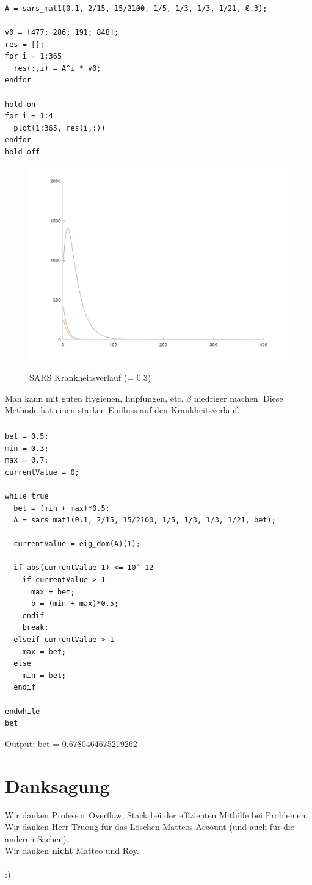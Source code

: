 \documentclass{article}
\begin{document}
\subsubsection{}
\begin{lstlisting}
A = sars_mat1(0.1, 2/15, 15/2100, 1/5, 1/3, 1/3, 1/21, 0.3);

v0 = [477; 286; 191; 848];
res = [];
for i = 1:365
  res(:,i) = A^i * v0;
endfor

hold on
for i = 1:4
  plot(1:365, res(i,:))
endfor
hold off
\end{lstlisting}

\begin{figure}[H]
\centering
\includegraphics[scale=0.3]{SARS1h.png}
\label{fig:universe}
\caption{SARS Krankheitsverlauf (\beta = 0.3)}
\end{figure}

Man kann mit guten Hygienen, Impfungen, etc. $\beta$ niedriger machen.
Diese Methode hat einen starken Einfluss auf den Krankheitsverlauf.

\subsubsection{}
\begin{lstlisting}
bet = 0.5;
min = 0.3;
max = 0.7;
currentValue = 0;

while true
  bet = (min + max)*0.5;
  A = sars_mat1(0.1, 2/15, 15/2100, 1/5, 1/3, 1/3, 1/21, bet);
  
  currentValue = eig_dom(A)(1);
  
  if abs(currentValue-1) <= 10^-12
    if currentValue > 1
      max = bet;
      b = (min + max)*0.5;
    endif
    break;
  elseif currentValue > 1
    max = bet;
  else
    min = bet;
  endif
  
endwhile
bet
\end{lstlisting}
Output: bet = 0.6780464675219262

\vspace{5mm}

\section{Danksagung}
Wir danken Professor Overflow, Stack bei der effizienten Mithilfe bei Problemen. \\
Wir danken Herr Truong für das Löschen Matteos Account (und auch für die anderen Sachen). \\
Wir danken \textbf{nicht} Matteo und Roy. \\
\\
:) \\
\end{document}
